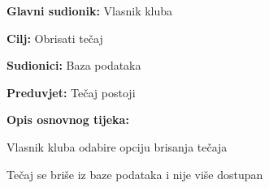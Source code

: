 					\noindent {}
					\begin{packed_item}
	
						\item \textbf{Glavni sudionik: }Vlasnik kluba
						\item  \textbf{Cilj:} Obrisati tečaj
						\item  \textbf{Sudionici:} Baza podataka
						\item  \textbf{Preduvjet:} Tečaj postoji
						\item  \textbf{Opis osnovnog tijeka:}
						
						\item[] \begin{packed_enum}
	
							\item Vlasnik kluba odabire opciju brisanja tečaja
							\item Tečaj se briše iz baze podataka i nije više dostupan
						\end{packed_enum}
						
					\end{packed_item}

